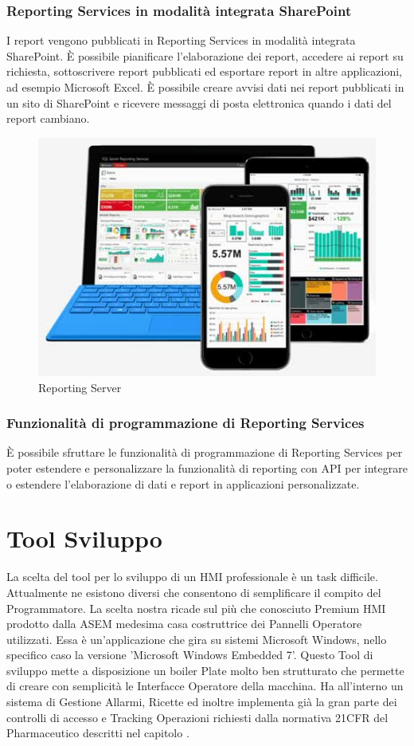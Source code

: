 \documentclass[12pt, a4paper, oneside]{book}
\begin{document}
\subsubsection{Reporting Services in modalità integrata SharePoint}
I report vengono pubblicati in Reporting Services in modalità integrata SharePoint. È possibile pianificare l'elaborazione dei report, accedere ai report su richiesta, sottoscrivere report pubblicati ed esportare report in altre applicazioni, ad esempio Microsoft Excel. È possibile creare avvisi dati nei report pubblicati in un sito di SharePoint e ricevere messaggi di posta elettronica quando i dati del report cambiano.

\begin{figure}[H]
	\centering
	\includegraphics[width=13cm]{Immagini/REP1}
	\caption{Reporting Server}
	\label{REP1}
\end{figure}

\subsubsection{Funzionalità di programmazione di Reporting Services }
È possibile sfruttare le funzionalità di programmazione di Reporting Services per poter estendere e personalizzare la funzionalità di reporting con API per integrare o estendere l'elaborazione di dati e report in applicazioni personalizzate.

\section{Tool Sviluppo}
La scelta del tool per lo sviluppo di un HMI professionale è un task difficile. Attualmente ne esistono diversi che consentono di semplificare il compito del Programmatore. 
La scelta nostra ricade sul più che conosciuto Premium HMI prodotto dalla ASEM medesima casa costruttrice dei Pannelli Operatore utilizzati. Essa è un'applicazione che gira su sistemi Microsoft Windows, nello specifico caso la versione 'Microsoft Windows Embedded 7'.
Questo Tool di sviluppo mette a disposizione un boiler Plate molto ben strutturato che permette di creare con semplicità le Interfacce Operatore della macchina. Ha all'interno un sistema di Gestione Allarmi, Ricette ed inoltre implementa già la gran parte dei controlli di accesso e Tracking Operazioni richiesti dalla normativa 21CFR del Pharmaceutico descritti nel capitolo \cite{CFR}.
\end{document}
